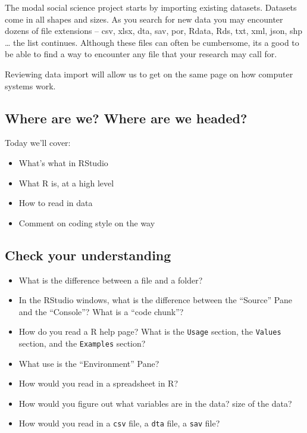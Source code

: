 \documentclass[
]{book}
\providecommand{\tightlist}{%
  \setlength{\itemsep}{0pt}\setlength{\parskip}{0pt}}
\theoremstyle{definition}
\theoremstyle{definition}
\theoremstyle{definition}
\theoremstyle{remark}
\begin{document}
The modal social science project starts by importing existing datasets. Datasets come in all shapes and sizes. As you search for new data you may encounter dozens of file extensions -- csv, xlsx, dta, sav, por, Rdata, Rds, txt, xml, json, shp \ldots{} the list continues. Although these files can often be cumbersome, its a good to be able to find a way to encounter any file that your research may call for.

Reviewing data import will allow us to get on the same page on how computer systems work.

\hypertarget{where-are-we-where-are-we-headed}{%
\subsection*{Where are we? Where are we headed?}\label{where-are-we-where-are-we-headed}}

Today we'll cover:

\begin{itemize}
\tightlist
\item
  What's what in RStudio
\item
  What R is, at a high level
\item
  How to read in data
\item
  Comment on coding style on the way
\end{itemize}

\hypertarget{check-your-understanding}{%
\subsection*{Check your understanding}\label{check-your-understanding}}

\begin{itemize}
\tightlist
\item
  What is the difference between a file and a folder?
\item
  In the RStudio windows, what is the difference between the ``Source'' Pane and the ``Console''? What is a ``code chunk''?
\item
  How do you read a R help page? What is the \texttt{Usage} section, the \texttt{Values} section, and the \texttt{Examples} section?
\item
  What use is the ``Environment'' Pane?
\item
  How would you read in a spreadsheet in R?
\item
  How would you figure out what variables are in the data? size of the data?
\item
  How would you read in a \texttt{csv} file, a \texttt{dta} file, a \texttt{sav} file?
\end{itemize}
\end{document}
